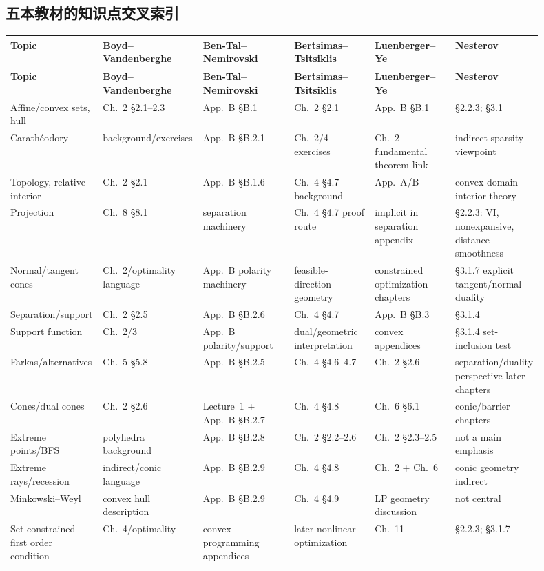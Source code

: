 \documentclass[11pt,a4paper,openany]{ctexrep}
\theoremstyle{definition}
\begin{document}
\begin{landscape}
\chapter{五本教材的知识点交叉索引}
\scriptsize
\setlength{\tabcolsep}{2.5pt}
\begin{longtable}{p{0.12\linewidth}p{0.15\linewidth}p{0.17\linewidth}p{0.15\linewidth}p{0.15\linewidth}p{0.16\linewidth}}
\toprule
\textbf{Topic} & \textbf{Boyd--Vandenberghe} & \textbf{Ben-Tal--Nemirovski} & \textbf{Bertsimas--Tsitsiklis} & \textbf{Luenberger--Ye} & \textbf{Nesterov}\\
\midrule
\endfirsthead
\toprule
\textbf{Topic} & \textbf{Boyd--Vandenberghe} & \textbf{Ben-Tal--Nemirovski} & \textbf{Bertsimas--Tsitsiklis} & \textbf{Luenberger--Ye} & \textbf{Nesterov}\\
\midrule
\endhead
Affine/convex sets, hull & Ch.~2 \S2.1--2.3 & App.~B \S B.1 & Ch.~2 \S2.1 & App.~B \S B.1 & \S2.2.3; \S3.1\\
Carath\'eodory & background/exercises & App.~B \S B.2.1 & Ch.~2/4 exercises & Ch.~2 fundamental theorem link & indirect sparsity viewpoint\\
Topology, relative interior & Ch.~2 \S2.1 & App.~B \S B.1.6 & Ch.~4 \S4.7 background & App.~A/B & convex-domain interior theory\\
Projection & Ch.~8 \S8.1 & separation machinery & Ch.~4 \S4.7 proof route & implicit in separation appendix & \S2.2.3: VI, nonexpansive, distance smoothness\\
Normal/tangent cones & Ch.~2/optimality language & App.~B polarity machinery & feasible-direction geometry & constrained optimization chapters & \S3.1.7 explicit tangent/normal duality\\
Separation/support & Ch.~2 \S2.5 & App.~B \S B.2.6 & Ch.~4 \S4.7 & App.~B \S B.3 & \S3.1.4\\
Support function & Ch.~2/3 & App.~B polarity/support & dual/geometric interpretation & convex appendices & \S3.1.4 set-inclusion test\\
Farkas/alternatives & Ch.~5 \S5.8 & App.~B \S B.2.5 & Ch.~4 \S4.6--4.7 & Ch.~2 \S2.6 & separation/duality perspective later chapters\\
Cones/dual cones & Ch.~2 \S2.6 & Lecture~1 + App.~B \S B.2.7 & Ch.~4 \S4.8 & Ch.~6 \S6.1 & conic/barrier chapters\\
Extreme points/BFS & polyhedra background & App.~B \S B.2.8 & Ch.~2 \S2.2--2.6 & Ch.~2 \S2.3--2.5 & not a main emphasis\\
Extreme rays/recession & indirect/conic language & App.~B \S B.2.9 & Ch.~4 \S4.8 & Ch.~2 + Ch.~6 & conic geometry indirect\\
Minkowski--Weyl & convex hull description & App.~B \S B.2.9 & Ch.~4 \S4.9 & LP geometry discussion & not central\\
Set-constrained first order condition & Ch.~4/optimality & convex programming appendices & later nonlinear optimization & Ch.~11 & \S2.2.3; \S3.1.7\\
\bottomrule
\end{longtable}
\end{landscape}
\end{document}

